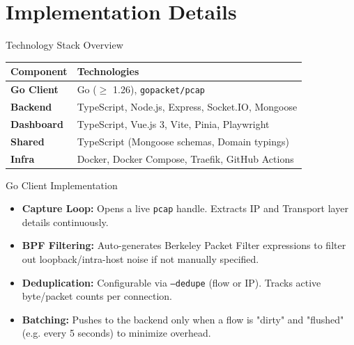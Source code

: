 \documentclass[aspectratio=169]{beamer}
\begin{document}
\section{Implementation Details}

\begin{frame}{Technology Stack Overview}
    \begin{table}[]
        \centering
        \begin{tabular}{@{}ll@{}}
            \toprule
            \textbf{Component} & \textbf{Technologies} \\ \midrule
            \textbf{Go Client} & Go ($\ge$ 1.26), \texttt{gopacket/pcap} \\
            \textbf{Backend}   & TypeScript, Node.js, Express, Socket.IO, Mongoose \\
            \textbf{Dashboard} & TypeScript, Vue.js 3, Vite, Pinia, Playwright \\
            \textbf{Shared}    & TypeScript (Mongoose schemas, Domain typings) \\
            \textbf{Infra}     & Docker, Docker Compose, Traefik, GitHub Actions \\ \bottomrule
        \end{tabular}
    \end{table}
\end{frame}

\begin{frame}{Go Client Implementation}
    \begin{itemize}
        \item \textbf{Capture Loop:} Opens a live \texttt{pcap} handle. Extracts IP and Transport layer details continuously.
        \item \textbf{BPF Filtering:} Auto-generates Berkeley Packet Filter expressions to filter out loopback/intra-host noise if not manually specified.
        \item \textbf{Deduplication:} Configurable via \texttt{--dedupe} (flow or IP). Tracks active byte/packet counts per connection.
        \item \textbf{Batching:} Pushes to the backend only when a flow is "dirty" and "flushed" (e.g. every 5 seconds) to minimize overhead.
    \end{itemize}
\end{frame}
\end{document}
